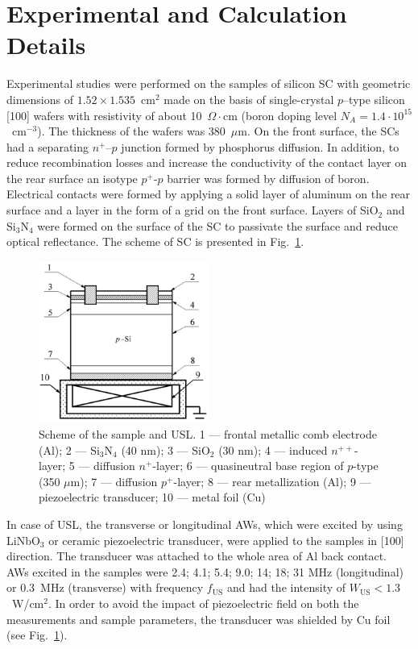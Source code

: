 \documentclass[sn-mathphys]{sn-jnl}%
\theoremstyle{thmstyleone}%
\theoremstyle{thmstyletwo}%
\theoremstyle{thmstylethree}%
\begin{document}
\section{Experimental and Calculation Details}
\label{sec:1}

Experimental studies were performed on the samples of silicon SC with geometric dimensions of $1.52\times1.535$~cm$^2$ made on the basis of single-crystal  $p$--type silicon [100] wafers with resistivity of about 10~$\Omega\cdot$cm
(boron doping level  $N_A=1.4\cdot10^{15}$~cm$^{-3}$).
The thickness of the wafers was 380~$\mu$m.
On the front surface, the SCs had a separating $n^+$--$p$ junction formed by phosphorus diffusion.
In addition, to reduce recombination losses and increase the conductivity of the contact layer
on the rear surface an isotype $p^+$-$p$ barrier was formed by diffusion of boron.
Electrical contacts were formed by applying a solid layer of aluminum on the rear surface and a layer in the form of a grid on the front surface.
Layers of SiO$_2$ and Si$_3$N$_4$ were formed on the surface of the SC to passivate the surface and reduce optical reflectance.
The scheme of SC is presented in Fig.~\ref{figChem}.
\begin{figure}
\centering
\includegraphics[width=0.5\textwidth]{Fig1}
\caption{Scheme of the sample and USL.
1 –-- frontal metallic comb electrode (Al);
2 --– Si$_3$N$_4$ (40 nm);
3 –-- SiO$_2$ (30 nm);
4 –-- induced $n^{++}$-layer;
5 –-- diffusion $n^+$-layer;
6 –-- quasineutral base region of $p$-type (350 $\mu$m);
7 –-- diffusion $p^+$-layer;
8 –-- rear metallization (Al);
9 –-- piezoelectric transducer;
10 –-- metal foil (Cu)}
\label{figChem}       %
\end{figure}

In case of USL, the transverse or longitudinal AWs, which were excited by using LiNbO$_3$ or ceramic piezoelectric transducer,
were applied to the samples in [100] direction.
The transducer was attached to the whole area of Al back contact.
AWs excited in the samples were 2.4; 4.1; 5.4; 9.0; 14; 18; 31 MHz (longitudinal) or 0.3~MHz (transverse)
with frequency $f_\mathrm{US}$ and had the intensity of $W_\mathrm{US}<1.3$~W/cm$^2$.
In order to avoid the impact of piezoelectric field on both the measurements and sample parameters,
the transducer was shielded by Cu foil (see Fig.~\ref{figChem}).
\end{document}
